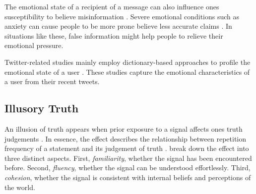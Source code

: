 \documentclass[
10pt, %
a4paper, %
oneside, %
headinclude,footinclude, %
] {book}%
\begin{document}

The emotional state of a recipient of a message can also influence ones susceptibility to believe misinformation \citep{psychological_drivers_misinformation}. Severe emotional conditions such as anxiety can cause people to be more prone believe less accurate claims \citep{difonzo2007rumor}. In situations like these, false information might help people to relieve their emotional pressure. 

Twitter-related studies mainly employ dictionary-based approaches to profile the emotional state of a user \citep{karami2021profiling, joy2021you}. These studies capture the emotional characteristics of a user from their recent tweets.



\subsection{Illusory Truth}
\label{subsec:illusory_truth_theory}

An illusion of truth appears when prior exposure to a signal affects ones truth judgements \citep{psychological_drivers_misinformation}. In essence, the effect describes the relationship between repetition frequency of a statement and its judgement of truth \citep{wang_illusory_truth}. \cite{psychological_drivers_misinformation} break down the effect into three distinct aspects. First, \emph{familiarity}, whether the signal has been encountered before. Second, \emph{fluency}, whether the signal can be understood effortlessly. Third, \emph{cohesion}, whether the signal is consistent with internal beliefs and perceptions of the world. 

\end{document}
